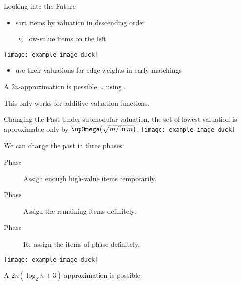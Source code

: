 \begin{frame}{Looking into the Future}
	\begin{itemize}
		\item
		sort items by valuation in descending order
		\begin{itemize}
			\item
			low-value items on the left
		\end{itemize}
	\end{itemize}
	\begin{center}
		\texttt{[image: example-image-duck]}
	\end{center}
	\begin{itemize}
		\item
		use their valuations for edge weights in early matchings
	\end{itemize}
	\begin{exampleblock}{}
		A \(2n\)-approximation is possible \dots{} using \SMatch.
	\end{exampleblock}
	\begin{alertblock}{}
		This only works for additive valuation functions.
	\end{alertblock}
\end{frame}

\begin{frame}{Changing the Past}
	Under submodular valuation, the set of lowest valuation is approximable only by \(\bigomega\paren[\big]{ \sqrt{m/\ln m} }\).
	\texttt{[image: example-image-duck]}

	We can change the past in three phases:
	\begin{description}
		\item[Phase \phasei]
		Assign enough high-value items temporarily.

		\item[Phase \phaseii]
		Assign the remaining items definitely.

		\item[Phase \phaseiii]
		Re-assign the items of phase \phasei{} definitely.
	\end{description}
	\begin{center}
		\texttt{[image: example-image-duck]}
	\end{center}
	\begin{exampleblock}{}
		A \(2n (\log_2 n + 3)\)-approximation is possible!
	\end{exampleblock}
\end{frame}





